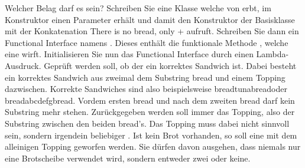 \documentclass{../preamble}
\begin{document}
\clearpage

\begin{task}[credit = \stars{3}{3}]{Welcher Belag darf es sein?}
    Schreiben Sie eine Klasse  welche von  erbt, im Konstruktor einen Parameter   erhält und damit den Konstruktor der Basisklasse mit der Konkatenation \textcolor{stringcolor}{\grqq There is no bread, only\grqq} +  aufruft.
    \br
    Schreiben Sie dann ein Functional Interface namens . Dieses enthält die funktionale Methode 
    \newline
    , welche eine  wirft.
    \br
    Initialisieren Sie nun das Functional Interface  durch einen Lambda-Ausdruck. Geprüft werden soll, ob der  ein korrektes Sandwich ist. Dabei besteht ein korrektes Sandwich aus zweimal dem Substring \textcolor{stringcolor}{\grqq bread\grqq} und einem Topping dazwischen. Korrekte Sandwiches sind also beispielsweise \textcolor{stringcolor}{\grqq breadtunabread\grqq}oder \textcolor{stringcolor}{\grqq breadabcdefgbread\grqq}. Vordem ersten \textcolor{stringcolor}{\grqq bread\grqq} und nach dem zweiten \textcolor{stringcolor}{\grqq bread\grqq} darf kein Substring  mehr stehen. Zurückgegeben werden soll immer das Topping, also der Substring zwischen den beiden \textcolor{stringcolor}{\grqq bread\grqq}'s. Das Topping muss dabei nicht \glqq sinnvoll\grqq{}  sein, sondern irgendein beliebiger . Ist kein Brot vorhanden, so soll eine  mit dem alleinigen Topping geworfen werden.
    \br
    Sie dürfen davon ausgehen, dass niemals nur eine Brotscheibe verwendet wird, sondern entweder zwei oder keine.

    \begin{solution}
        
        
        
    \end{solution}
\end{task}

\clearpage
\end{document}
